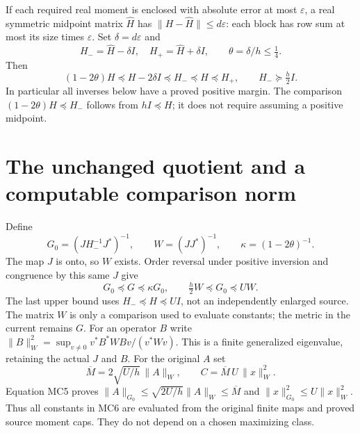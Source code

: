 \documentclass[11pt]{article}
\begin{document}
If each required real moment is enclosed with absolute error at most
$\varepsilon$, a real symmetric midpoint matrix $\widehat H$ has
$\|H-\widehat H\|\le d\varepsilon$: each block has row sum at most
its size times $\varepsilon$. Set $\delta=d\varepsilon$ and
\[
 H_-=\widehat H-\delta I,\quad H_+=\widehat H+\delta I,
 \qquad \theta=\delta/h\le\tfrac14.
                                                               \tag{MC3}
\]
Then
\[
 (1-2\theta)H\preceq H-2\delta I\preceq H_-
 \preceq H\preceq H_+,
 \qquad H_-\succeq\tfrac h2 I.                                \tag{MC4}
\]
In particular all inverses below have a proved positive margin. The
comparison $(1-2\theta)H\preceq H_-$ follows from $hI\preceq H$;
it does not require assuming a positive midpoint.

\section{The unchanged quotient and a computable comparison norm}
Define
\[
 G_0=(JH_-^{-1}J^*)^{-1},\qquad W=(JJ^*)^{-1},\qquad
 \kappa=(1-2\theta)^{-1}.
\]
The map $J$ is onto, so $W$ exists. Order reversal under positive
inversion and congruence by this same $J$ give
\[
 G_0\preceq G\preceq\kappa G_0,\qquad
 \tfrac h2 W\preceq G_0\preceq UW.                            \tag{MC5}
\]
The last upper bound uses $H_-\preceq H\preceq UI$, not an
independently enlarged source. The matrix $W$ is only a comparison
used to evaluate constants; the metric in the current remains $G$.
For an operator $B$ write
$\|B\|_W^2=\sup_{v\ne0}v^*B^*WBv/(v^*Wv)$. This is a finite
generalized eigenvalue, retaining the actual $J$ and $B$.
For the original $A$ set
\[
 \overline M=2\sqrt{U/h}\,\|A\|_W,\qquad
 C=\overline M\,U\,\|x\|_W^2.                                \tag{MC6}
\]
Equation MC5 proves $\|A\|_{G_0}\le\sqrt{2U/h}\|A\|_W
\le\overline M$ and $\|x\|_{G_0}^2\le U\|x\|_W^2$.
Thus all constants in MC6 are evaluated from the original finite maps
and proved source moment caps. They do not depend on a chosen
maximizing class.
\end{document}
